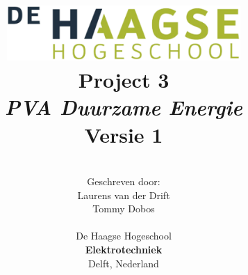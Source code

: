 \title{
\includegraphics[width=3.5in]{IMG/HHS.png} \\
\vspace*{2in}
\textbf{Project 3}\\
\textit{PVA Duurzame Energie}\\
Versie 1
}
\author{
\vspace*{2.5in} \\
  Geschreven door:\\
  Laurens van der Drift\\
  Tommy Dobos\\
		\vspace*{0.2in} \\
		De Haagse Hogeschool\\
        \textbf{Elektrotechniek}\\
        Delft, Nederland
       } 